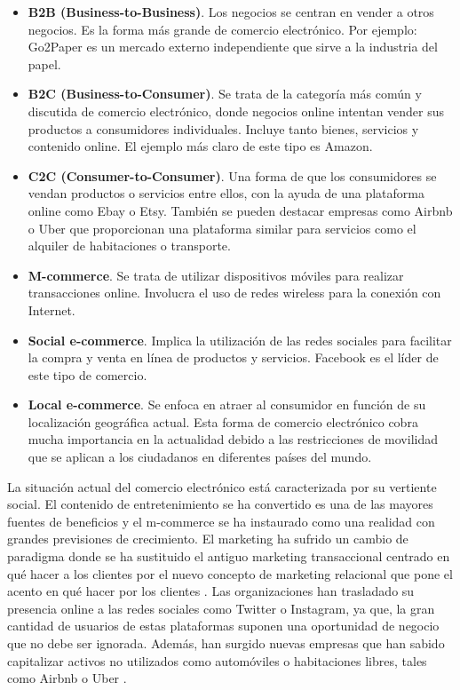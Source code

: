 \begin{itemize}
    \item \textbf{B2B (Business-to-Business)}. Los negocios se centran en vender a otros negocios. Es la forma más grande de comercio electrónico. Por ejemplo: Go2Paper es un mercado externo independiente que sirve a la industria del papel.
    \item \textbf{B2C (Business-to-Consumer)}. Se trata de la categoría más común y discutida de comercio electrónico, donde negocios online intentan vender sus productos a consumidores individuales. Incluye tanto bienes, servicios y contenido online. El ejemplo más claro de este tipo es Amazon.
    \item \textbf{C2C (Consumer-to-Consumer)}. Una forma de que los consumidores se vendan productos o servicios entre ellos, con la ayuda de una plataforma online como Ebay o Etsy. También se pueden destacar empresas como Airbnb o Uber que proporcionan una plataforma similar para servicios como el alquiler de habitaciones o transporte.
    \item \textbf{M-commerce}. Se trata de utilizar dispositivos móviles para realizar transacciones online. Involucra el uso de redes wireless para la conexión con Internet.
    \item \textbf{Social e-commerce}. Implica la utilización  de  las redes sociales para facilitar la compra y venta en línea de productos y servicios. Facebook es el líder de este tipo de comercio. 
    \item \textbf{Local e-commerce}. Se enfoca en atraer al consumidor en función de su localización geográfica actual. Esta forma de comercio electrónico cobra mucha importancia en la actualidad debido a las restricciones de movilidad que se aplican a los ciudadanos en diferentes países del mundo.
\end{itemize}

La situación actual del comercio electrónico está caracterizada por su vertiente social. El contenido de entretenimiento se ha convertido es una de las mayores fuentes de beneficios y el m-commerce se ha instaurado como una realidad con grandes previsiones de crecimiento. El marketing ha sufrido un cambio de paradigma donde se ha sustituido el antiguo marketing transaccional centrado en qué hacer a los clientes por el nuevo concepto de marketing relacional que pone el acento en qué hacer por los clientes \cite{manualGestion}. Las organizaciones han trasladado su presencia online a las redes sociales como Twitter o Instagram, ya que, la gran cantidad de usuarios de estas plataformas suponen una oportunidad de negocio que no debe ser ignorada. Además, han surgido nuevas empresas que han sabido capitalizar activos no utilizados como automóviles o habitaciones libres, tales como Airbnb o Uber \cite{E-commerce2016}. 

